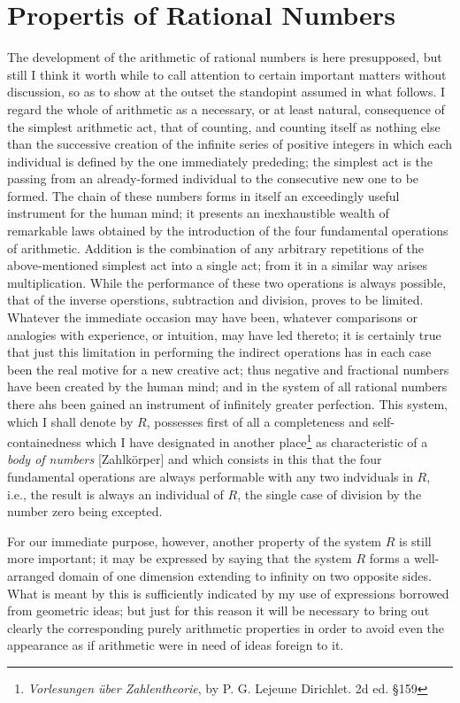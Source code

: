 \documentclass[oneside,12pt]{book}
\begin{document}
\section{Propertis of Rational Numbers}
\label{S1}
The development of the arithmetic of rational numbers is here presupposed, but still I think it worth while to call attention to certain important matters without discussion, 
so as to show at the outset the standopint assumed in what follows. I regard the whole of arithmetic as a necessary, or at least natural, consequence of the simplest arithmetic act,
that of counting, and counting itself as nothing else than the successive creation of the infinite series of positive integers in which each individual is defined by the one immediately prededing;
the simplest act is the passing from an already-formed individual to the consecutive new one to be formed. The chain of these numbers forms in itself an exceedingly useful instrument 
for the human mind; it presents an inexhaustible wealth of remarkable laws obtained by the introduction of the four fundamental operations of arithmetic. Addition is the combination of 
any arbitrary repetitions of the above-mentioned simplest act into a single act; from it in a similar way arises multiplication. While the performance of these two operations 
is always possible, that of the inverse operstions, subtraction and division, proves to be limited. Whatever the immediate occasion may have been, whatever comparisons or analogies 
with experience, or intuition, may have led thereto; it is certainly true that just this limitation in performing the indirect operations has in each case been the real motive for a new 
creative act; thus negative and fractional numbers have been created by the human mind; and in the system of all rational numbers there ahs been gained an instrument of infinitely greater
perfection. This system, which I shall denote by $R$, possesses first of all a completeness and self-containedness which I have designated in another place\footnote{\textit{Vorlesungen \"uber Zahlentheorie}, by P. G. Lejeune Dirichlet. 2d ed. \S 159} as characteristic of a \textit{body of numbers}
[Zahlk\"orper] and which consists in this that the four fundamental operations are always performable with any two indviduals in $R$, i.e., the result is always an individual of $R$,
the single case of division by the number zero being excepted. \par 

For our immediate purpose, however, another property of the system $R$ is still more important; it may be expressed by saying that the system $R$ forms a well-arranged domain of one
dimension extending to infinity on two opposite sides. What is meant by this is sufficiently indicated by my use of expressions borrowed from geometric ideas; but just for this reason
it will be necessary to bring out clearly the corresponding purely arithmetic properties in order to avoid even the appearance as if arithmetic were in need of ideas foreign
to it. \par 
\end{document}
